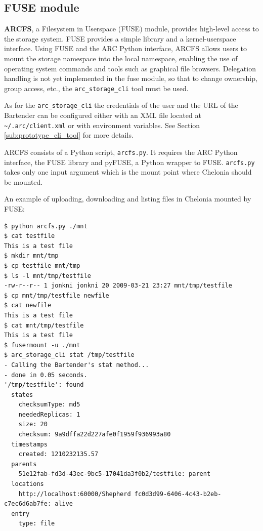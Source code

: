 \documentclass{book}
\begin{document}

\subsection{FUSE module} %
\label{sub:fuse_module}

\textbf{ARCFS}, a Filesystem in Userspace (FUSE) module, provides high-level access to the storage system. FUSE provides a simple library and a kernel-userspace interface. Using FUSE and the ARC Python interface, ARCFS allows users to mount the storage namespace into the local namespace, enabling the use of operating system commands and tools such as graphical file browsers. Delegation handling is not yet implemented in the fuse module, so that to change ownership, group access, etc., the \verb!arc_storage_cli! tool must be used.

As for the \verb!arc_storage_cli! the credentials of the user and the URL of the Bartender can be configured either with an XML file located at \verb!~/.arc/client.xml! or with environment variables. See Section \ref{sub:prototype_cli_tool} for more details.

ARCFS consists of a Python script, \verb!arcfs.py!. It requires the ARC Python interface, the FUSE library and pyFUSE, a Python wrapper to FUSE. \verb!arcfs.py! takes only one input argument which is the mount point where Chelonia should be mounted.

An example of uploading, downloading and listing files in Chelonia mounted by FUSE:

\begin{verbatim}
$ python arcfs.py ./mnt
$ cat testfile
This is a test file
$ mkdir mnt/tmp
$ cp testfile mnt/tmp
$ ls -l mnt/tmp/testfile
-rw-r--r-- 1 jonkni jonkni 20 2009-03-21 23:27 mnt/tmp/testfile
$ cp mnt/tmp/testfile newfile
$ cat newfile
This is a test file
$ cat mnt/tmp/testfile
This is a test file
$ fusermount -u ./mnt
$ arc_storage_cli stat /tmp/testfile
- Calling the Bartender's stat method...
- done in 0.05 seconds.
'/tmp/testfile': found
  states
    checksumType: md5
    neededReplicas: 1
    size: 20
    checksum: 9a9dffa22d227afe0f1959f936993a80
  timestamps
    created: 1210232135.57
  parents
    51e12fab-fd3d-43ec-9bc5-17041da3f0b2/testfile: parent
  locations
    http://localhost:60000/Shepherd fc0d3d99-6406-4c43-b2eb-c7ec6d6ab7fe: alive
  entry
    type: file
\end{verbatim}

\end{document}
